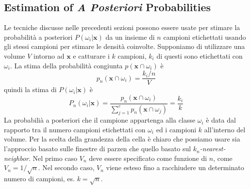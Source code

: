 \subsection{Estimation of \emph{A Posteriori} Probabilities}
Le tecniche discusse nelle precedenti sezioni possono essere usate per stimare la probabilità a posteriori $P(\omega_i|\mathbf{x})$ da un insieme di $n$ campioni etichettati usando gli stessi campioni per stimare le densità coinvolte. Supponiamo di utilizzare una volume $V$ intorno ad $\mathbf{x}$ e catturare i $k$ campioni, $k_i$ di questi sono etichettati con $\omega_i$. La stima della probabilità congiunta $p(\mathbf{x} \cap \omega_i)$ è 
\begin{equation}
p_n(\mathbf{x} \cap \omega_i) = \frac{k_i/n}{V}
\end{equation}
quindi la stima di $P(\omega_i | \mathbf{x})$ è
\begin{equation}
P_n(\omega_i | \mathbf{x}) = \frac{p_n(\mathbf{x} \cap \omega_i)}{\sum_{j=1}^c p_n(\mathbf{x} \cap \omega_j)} = \frac{k_i}{k}
\end{equation}
La probabilià a posteriori che il campione appartenga alla classe $\omega_i$ è data dal rapporto tra il numero campioni etichettati con $\omega_i$ ed i campioni $k$ all'interno del volume. Per la scelta della grandezza della cella è chiaro che possiamo usare sia l'approccio basato sulle finestre di parzen che quello basato sul $k_n$\emph{-nearest-neighbor}. Nel primo caso $V_n$ deve essere specificato come funzione di $n$, come $V_n = 1/\sqrt{n}$. Nel secondo caso, $V_n$ viene esteso fino a racchiudere un determinato numero di campioni, es. $k = \sqrt{n}$. 

